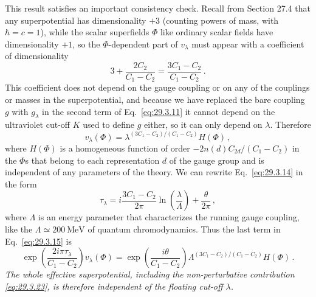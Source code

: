 This result satisfies an important consistency check. Recall from
Section 27.4 that any superpotential has dimensionality \(+3\) (counting
powers of mass, with \(\hbar=c=1\)), while the scalar superfields \(\Phi\)
like ordinary scalar fields have dimensionality \(+1\), so the
\(\Phi\)-dependent part of \(v_\lambda\) must appear with a coefficient of
dimensionality
\[
  3+\frac{2C_2}{C_1-C_2}
  =
  \frac{3C_1-C_2}{C_1-C_2}\,.
\]
This coefficient does not depend on the gauge coupling or on any of the
couplings or masses in the superpotential, and because we have replaced
the bare coupling \(g\) with \(g_\lambda\) in the second term of
Eq.~\eqref{eq:29.3.11} it cannot depend on the ultraviolet cut-off \(K\)
used to define \(g\) either, so it can only depend on \(\lambda\).
Therefore
\begin{equation}
  v_\lambda(\Phi)
  =
  \lambda^{(3C_1-C_2)/(C_1-C_2)}H(\Phi)\,,
  \tag{29.3.21}\label{eq:29.3.21}
\end{equation}
where \(H(\Phi)\) is a homogeneous function of order
\(-2n(d)C_{2d}/(C_1-C_2)\) in the \(\Phi\)s that belong to each
representation \(d\) of the gauge group and is independent of any
parameters of the theory. We can rewrite Eq.~\eqref{eq:29.3.14} in the
form
\begin{equation}
  \tau_\lambda
  =
  i\frac{3C_1-C_2}{2\pi}
  \ln\left(\frac{\lambda}{\Lambda}\right)
  +\frac{\theta}{2\pi}\,,
  \tag{29.3.22}\label{eq:29.3.22}
\end{equation}
where \(\Lambda\) is an energy parameter that characterizes the running
gauge coupling, like the \(\Lambda\simeq200\ \mathrm{MeV}\) of quantum
chromodynamics. Thus the last term in Eq.~\eqref{eq:29.3.15} is
\begin{equation}
  \exp\left(\frac{2i\pi\tau_\lambda}{C_1-C_2}\right)
  v_\lambda(\Phi)
  =
  \exp\left(\frac{i\theta}{C_1-C_2}\right)
  \Lambda^{(3C_1-C_2)/(C_1-C_2)}H(\Phi)\,.
  \tag{29.3.23}\label{eq:29.3.23}
\end{equation}
\emph{The whole effective superpotential, including the non-perturbative
contribution \eqref{eq:29.3.23}, is therefore independent of the floating
cut-off \(\lambda\).}

